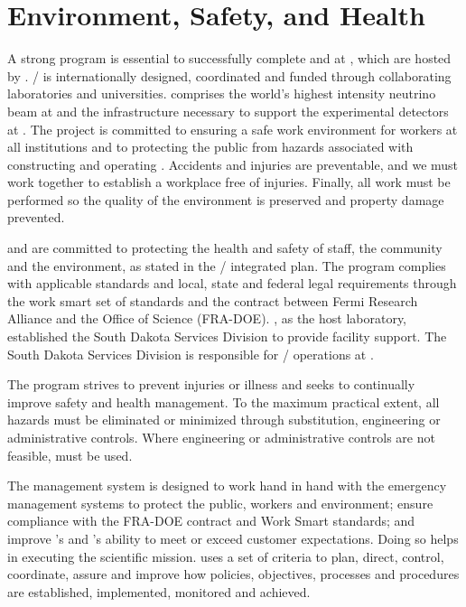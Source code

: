 \chapter{Environment, Safety, and Health}
\label{vl:tc-ESH}


A strong  program is essential to successfully complete
 and  at \surf, which are hosted by
\fnal.  / is internationally designed,
coordinated and funded through collaborating laboratories and
universities.   comprises the
world's highest intensity neutrino beam at \fnal and the
infrastructure necessary to support the experimental detectors at
\surf. The  project is committed to ensuring a
safe work environment for  workers at all
institutions and to protecting the public from hazards associated with
constructing and operating .  Accidents and
injuries are preventable, and we must work together to
establish a workplace free of injuries.  Finally, all work must be
performed so the quality of the environment is preserved
and property damage prevented.

\fnal and  are committed to protecting the health and
safety of staff, the community and the environment, as stated in the
/ integrated  plan.  The
 program complies with applicable standards and local,
state and federal legal requirements through the \fnal work smart set
of standards and the contract between Fermi Research Alliance and the
 Office of Science (FRA-DOE). \fnal, as the host
laboratory, established the South Dakota Services Division to provide
facility support.  The South Dakota Services Division is responsible
for / operations at \surf.

The \fnal {} program strives to prevent injuries or illness and seeks to
continually improve safety and health management.  To the maximum
practical extent, all hazards must be eliminated or minimized through
substitution, engineering or administrative controls.  Where
engineering or administrative controls are not feasible, 
must be used.

The  management system is designed to work hand in hand
with the \surf emergency management systems to protect the public,
workers and environment; ensure compliance with the FRA-DOE contract
and \fnal Work Smart standards; and improve \fnal's and 's
ability to meet or exceed customer expectations. Doing so helps in
executing the scientific mission.  \fnal uses a set of criteria to
plan, direct, control, coordinate, assure and improve how 
policies, objectives, processes and procedures are established,
implemented, monitored and achieved.

